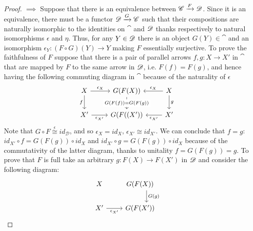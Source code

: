 \begin{proof}
$\implies$
Suppose that there is an equivalence between $\mathscr{C}\xrightarrow{F}\mathscr{D}$. Since it is an equivalence, there must be a functor $\mathscr{D}\xrightarrow{G}\mathscr{C}$ such that their compositions are naturally isomorphic to the identities on $\cat$ and $\mathscr{D}$ thanks respectively to natural isomorphisms $\epsilon$ and $\eta$. Thus, for any $Y\in\mathscr{D}$ there is an object $G(Y)\in\cat$ and an isomorphism $\epsilon_Y:(F\circ G)(Y)\to Y$ making $F$ essentially surjective. To prove the faithfulness of $F$ suppose that there is a pair of parallel arrows $f,g:X\to X'$ in $\cat$ that are mapped by $F$ to the same arrow in $\mathscr{D}$, i.e. $F(f)=F(g)$, and hence having the following commuting diagram in $\cat$ because of the naturality of $\epsilon$
\[\begin{tikzcd}
    X & {G(F(X))} & X \\
    {X'} & {G(F((X'))} & {X'}
    \arrow["{G(F(f))=G(F(g))}"{description}, from=1-2, to=2-2]
    \arrow["{\epsilon_X}", from=1-1, to=1-2]
    \arrow["f"', from=1-1, to=2-1]
    \arrow["{\epsilon_{X'}}"', from=2-1, to=2-2]
    \arrow["{\epsilon_X}"', from=1-3, to=1-2]
    \arrow["g", from=1-3, to=2-3]
    \arrow["{\epsilon_{X'}}", from=2-3, to=2-2]
\end{tikzcd}\]
Note that $G\circ F\overset{\epsilon}{\cong}id_{\mathscr{D}}$, and so $\epsilon_X=id_X$, $\epsilon_{X'}\cong id_{X'}$. We can conclude that  $f=g$: $id_{X'}\circ f=G(F(g))\circ id_X$ and $id_{X'}\circ g=G(F(g))\circ id_X$ because of the commutativity of the latter diagram, thanks to unitality $f=G(F(g))=g$. To prove that $F$ is full take an arbitrary $g:F(X)\to F(X')$ in $\mathscr{D}$ and consider the following diagram:
\[\begin{tikzcd}
    X & {G(F(X))} \\
    {X'} & {G(F(X'))}
    \arrow["{\epsilon_{X'}}"', from=2-1, to=2-2]
    \arrow["{G(g)}", shift left=4, from=1-2, to=2-2]

\end{tikzcd}\]
\end{proof}
